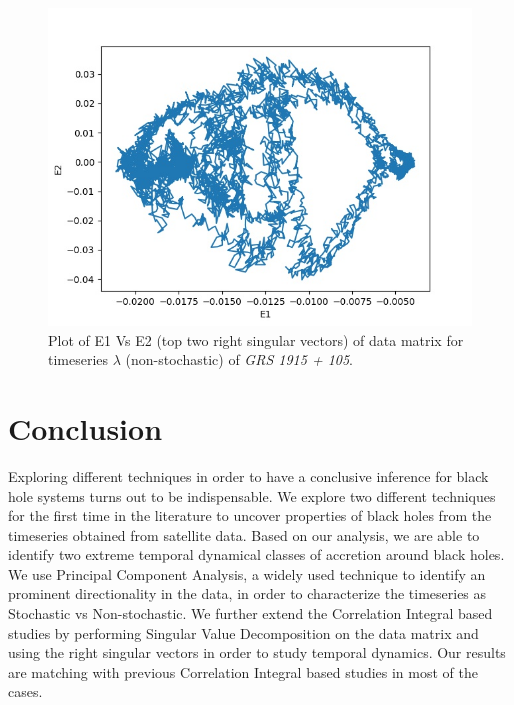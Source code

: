 \documentclass[10pt,conference]{IEEEtran}
\begin{document}
\begin{figure}[ht]
  \centering
  \includegraphics[width=\linewidth]{lamda_svd.jpg}
  \caption{Plot of E1 Vs E2 (top two right singular vectors) of data matrix for  timeseries $\lambda$ (non-stochastic) of \textit{GRS 1915 + 105}.}
  \label{lamda_svd}
\end{figure}


\section{Conclusion}
Exploring different techniques in order to have a conclusive inference for black hole systems turns out to be indispensable. We explore two different techniques for the first time in the literature to uncover  properties of black holes from the timeseries obtained from satellite data. Based on our analysis, we are able to identify two extreme temporal dynamical classes of accretion around black holes. We use Principal Component Analysis, a widely used technique to identify an prominent directionality in the data, in order to characterize the timeseries as Stochastic vs Non-stochastic. We further extend the Correlation Integral based studies by performing Singular Value Decomposition on the data matrix and using the right singular vectors in order to study temporal dynamics. Our results  are matching with previous Correlation Integral based studies in most of the cases.
\end{document}
